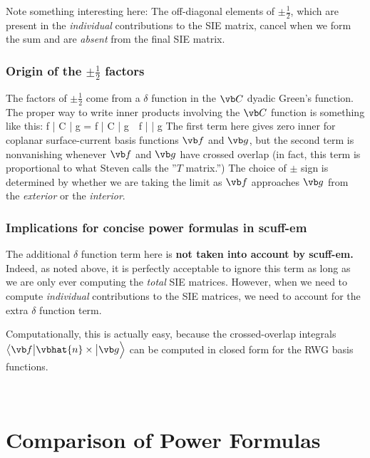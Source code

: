 \documentclass{article}
\newcommand{\vmv}[3]{ \big\langle #1 \big| #2 \big| #3 \Big\rangle}
\newcommand{\VMV}[3]{ \Big\langle #1 \Big| #2 \Big| #3 \Big\rangle}
\begin{document}
Note something interesting here: The off-diagonal elements of 
$\pm \frac{1}{2}$, which are present in the \textit{individual}
contributions to the SIE matrix, cancel when we form the sum 
and are \textit{absent} from the final SIE matrix.

\subsubsection*{Origin of the $\pm\frac{1}{2}$ factors}

The factors of $\pm \frac{1}{2}$ come from a $\delta$ function
in the $\vb C$ dyadic Green's function. The proper way to 
write inner products involving the $\vb C$ function is something
like this:
{
   \VMV{\vb f}{\vb C}{\vb g} 
   = 
     \VMV{\vb f}{\vb C}{\vb g} 
     \,\pm\, 
     \cdot \VMV{\vb f}{\times}{\vb g} 
}
The first term here gives zero inner for coplanar surface-current 
basis functions $\vb f$ and $\vb g$, but the second term 
is nonvanishing whenever $\vb f$ and $\vb g$ have crossed
overlap (in fact, this term is proportional to what Steven
calls the ''$T$ matrix.'') The choice of $\pm$ sign is 
determined by whether we are taking the limit as $\vb f$ approaches
$\vb g$ from the \textit{exterior} or the \textit{interior}. 

\subsubsection*{Implications for concise power formulas in {\sc scuff-em}}

The additional $\delta$ function term here is
\textbf{not taken into account by {\sc scuff-em.}}
Indeed, as noted above, it is perfectly acceptable 
to ignore this term as long as we are only ever computing
the \textit{total} SIE matrices. 
However, when we need to compute \textit{individual} 
contributions to the SIE matrices, we need to account for
the extra $\delta$ function term. 

Computationally, this is actually easy, because the crossed-overlap
integrals $\vmv{\vb f}{\vbhat{n}\times}{\vb g}$ can be computed in 
closed form for the RWG basis functions.

\
\section{Comparison of Power Formulas}
\end{document}
